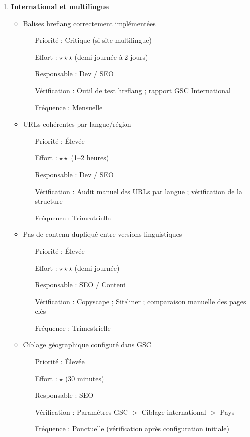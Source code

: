 \documentclass[12pt,a4paper,twoside]{report}
\begin{document}
\begin{enumerate}
    \item \textbf{International et multilingue}
    \begin{itemize}
        \item Balises hreflang correctement implémentées
        \begin{itemize}
            \item[Priorité :] Critique (si site multilingue)
            \item[Effort :] $\star\star\star$ (demi-journée à 2 jours)
            \item[Responsable :] Dev / SEO
            \item[Vérification :] Outil de test hreflang ; rapport GSC International
            \item[Fréquence :] Mensuelle
        \end{itemize}
        \item URLs cohérentes par langue/région
        \begin{itemize}
            \item[Priorité :] Élevée
            \item[Effort :] $\star\star$ (1--2 heures)
            \item[Responsable :] Dev / SEO
            \item[Vérification :] Audit manuel des URLs par langue ; vérification de la structure
            \item[Fréquence :] Trimestrielle
        \end{itemize}
        \item Pas de contenu dupliqué entre versions linguistiques
        \begin{itemize}
            \item[Priorité :] Élevée
            \item[Effort :] $\star\star\star$ (demi-journée)
            \item[Responsable :] SEO / Content
            \item[Vérification :] Copyscape ; Siteliner ; comparaison manuelle des pages clés
            \item[Fréquence :] Trimestrielle
        \end{itemize}
        \item Ciblage géographique configuré dans GSC
        \begin{itemize}
            \item[Priorité :] Élevée
            \item[Effort :] $\star$ (30 minutes)
            \item[Responsable :] SEO
            \item[Vérification :] Paramètres GSC $>$ Ciblage international $>$ Pays
            \item[Fréquence :] Ponctuelle (vérification après configuration initiale)
        \end{itemize}
    \end{itemize}
\end{enumerate}
\end{document}
